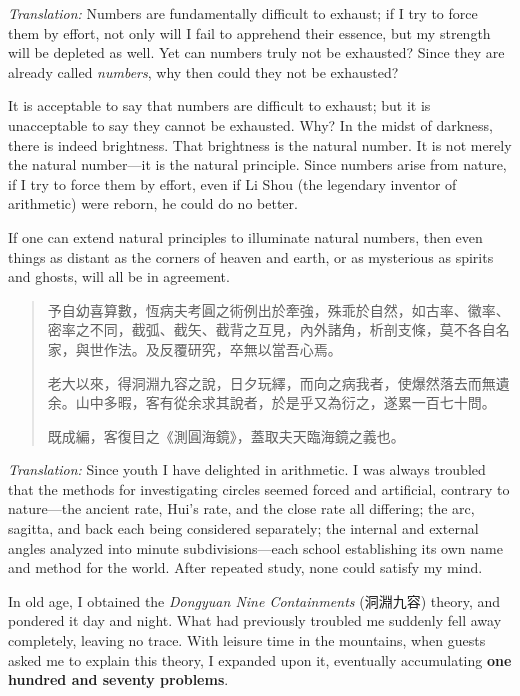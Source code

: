 \documentclass[11pt,a4paper]{article}
\begin{document}
\vspace{0.5cm}
\noindent\textit{Translation:} Numbers are fundamentally difficult to exhaust; if I try to force them by effort, not only will I fail to apprehend their essence, but my strength will be depleted as well. Yet can numbers truly not be exhausted? Since they are already called \textit{numbers}, why then could they not be exhausted?

It is acceptable to say that numbers are difficult to exhaust; but it is unacceptable to say they cannot be exhausted. Why? In the midst of darkness, there is indeed brightness. That brightness is the natural number. It is not merely the natural number---it is the natural principle. Since numbers arise from nature, if I try to force them by effort, even if Li Shou (the legendary inventor of arithmetic) were reborn, he could do no better.

If one can extend natural principles to illuminate natural numbers, then even things as distant as the corners of heaven and earth, or as mysterious as spirits and ghosts, will all be in agreement.

\vspace{0.5cm}

{\color{prefacecolor}
\begin{quote}
予自幼喜算數，恆病夫考圓之術例出於牽強，殊乖於自然，如古率、徽率、密率之不同，截弧、截矢、截背之互見，內外諸角，析剖支條，莫不各自名家，與世作法。及反覆研究，卒無以當吾心焉。

老大以來，得洞淵九容之說，日夕玩繹，而向之病我者，使爆然落去而無遺余。山中多暇，客有從余求其說者，於是乎又為衍之，遂累一百七十問。

既成編，客復目之《測圓海鏡》，蓋取夫天臨海鏡之義也。
\end{quote}
}

\vspace{0.5cm}
\noindent\textit{Translation:} Since youth I have delighted in arithmetic. I was always troubled that the methods for investigating circles seemed forced and artificial, contrary to nature---the ancient rate, Hui's rate, and the close rate all differing; the arc, sagitta, and back each being considered separately; the internal and external angles analyzed into minute subdivisions---each school establishing its own name and method for the world. After repeated study, none could satisfy my mind.

In old age, I obtained the \textit{Dongyuan Nine Containments} (洞淵九容) theory, and pondered it day and night. What had previously troubled me suddenly fell away completely, leaving no trace. With leisure time in the mountains, when guests asked me to explain this theory, I expanded upon it, eventually accumulating \textbf{one hundred and seventy problems}.
\end{document}
